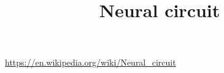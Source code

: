 \documentclass[a4paper]{article}
\title{Neural circuit}
\date{}
\begin{document}
    \maketitle
    \url{https://en.wikipedia.org/wiki/Neural_circuit}
\end{document}
